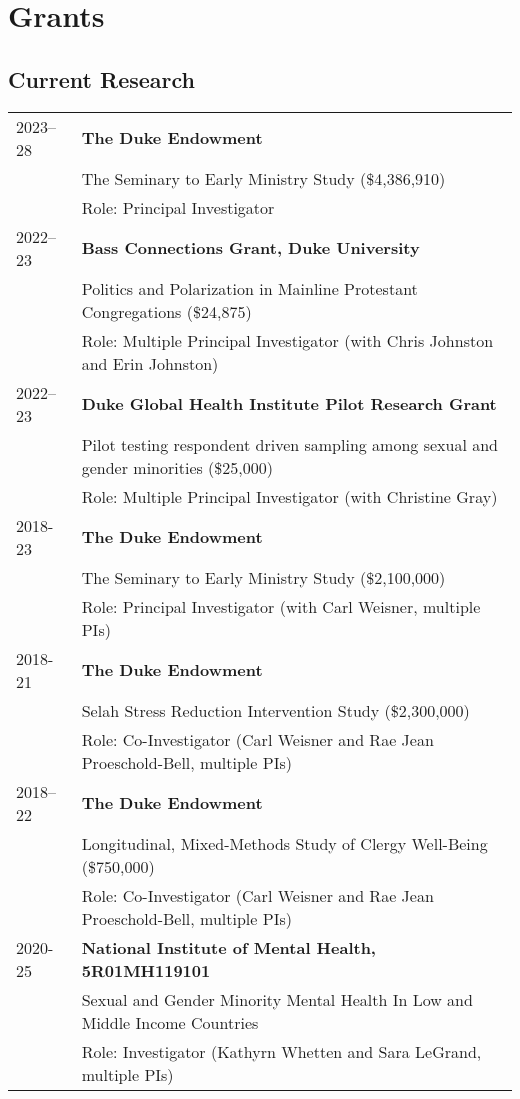 \newpage
\section*{Grants}
\subsection*{Current Research}
\begin{longtable}{p{} p{}}
	
2023--28 & \textbf{The Duke Endowment}\\
& The Seminary to Early Ministry Study (\$4,386,910)\\
& Role: Principal Investigator\\

2022--23 & \textbf{Bass Connections Grant, Duke University}\\
& Politics and Polarization in Mainline Protestant Congregations (\$24,875)\\
& Role: Multiple Principal Investigator (with Chris Johnston and Erin Johnston)\\

2022--23 & \textbf{Duke Global Health Institute Pilot Research Grant}\\
& Pilot testing respondent driven sampling among sexual and gender minorities (\$25,000)\\
& Role: Multiple Principal Investigator (with Christine Gray)\\

2018-23 & \textbf{The Duke Endowment}\\
& The Seminary to Early Ministry Study (\$2,100,000)\\
& Role: Principal Investigator (with Carl Weisner, multiple PIs)\\
\vspace{.2em}
2018-21 & \textbf{The Duke Endowment}\\
& Selah Stress Reduction Intervention Study (\$2,300,000)\\
& Role: Co-Investigator (Carl Weisner and Rae Jean Proeschold-Bell, multiple PIs)\\

2018--22 & \textbf{The Duke Endowment}\\
& Longitudinal, Mixed-Methods Study of Clergy Well-Being (\$750,000)\\
& Role: Co-Investigator (Carl Weisner and Rae Jean Proeschold-Bell, multiple PIs)\\

2020-25 & \textbf{National Institute of Mental Health, 5R01MH119101} \\
& Sexual and Gender Minority Mental Health In Low and Middle Income Countries \\
& Role: Investigator (Kathyrn Whetten and Sara LeGrand, multiple PIs)\\
\end{longtable}

